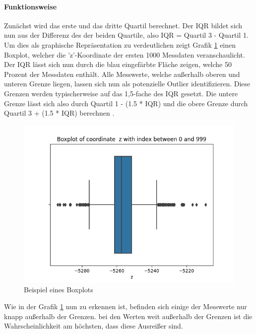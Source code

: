 \paragraph{Funktionsweise}
Zunächst wird das erste und das dritte Quartil berechnet. Der IQR bildet sich nun aus der Differenz des der beiden Quartile, also IQR = Quartil 3 - Quartil 1. Um dies als graphische Repräsentation zu verdeutlichen zeigt Grafik \ref{fig:boxplot_example} einen Boxplot, welcher die 'z'-Koordinate der ersten 1000 Messdaten veranschaulicht. Der IQR lässt sich nun durch die blau eingefärbte Fläche zeigen, welche 50 Prozent der Messdaten enthält. Alle Messwerte, welche außerhalb oberen und unteren Grenze liegen, lassen sich nun als potenzielle Outlier identifizieren. Diese Grenzen werden typischerweise auf das 1,5-fache des IQR gesetzt. Die untere Grenze lässt sich also durch Quartil 1 - (1.5 * IQR) und die obere Grenze durch Quartil 3 + (1.5 * IQR) berechnen \cite{vinuthaDetectionOutliersUsing2018}. 

\begin{figure}[h!]
	\includegraphics[width=\textwidth]{img/boxplot_example.png}
	\caption[Beispiel eines Boxplots]{Beispiel eines Boxplots}
	\label{fig:boxplot_example}
\end{figure}

\FloatBarrier
Wie in der Grafik \ref{fig:boxplot_example} nun zu erkennen ist, befinden sich einige der Messwerte nur knapp außerhalb der Grenzen. bei den Werten weit außerhalb der Grenzen ist die Wahrscheinlichkeit am höchsten, dass diese Ausreißer sind.

